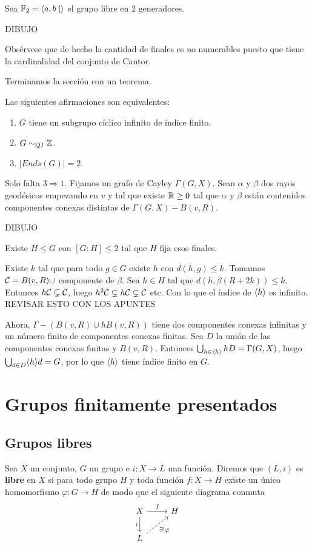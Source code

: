 \documentclass[twoside, 11pt]{article}
\begin{document}
\begin{ej}
Sea $\mathbb{F}_2=\langle{a,b\mid}\rangle$ el grupo libre en 2 generadores.

DIBUJO

Obsérvese que de hecho la cantidad de finales es no numerables puesto que tiene la cardinalidad del conjunto de Cantor. 
\end{ej}

Terminamos la sección con un teorema.

\begin{teorema}
Las siguientes afirmaciones son equivalentes:
\begin{enumerate}
\item $G$ tiene un subgrupo cíclico infinito de índice finito.
\item $G\sim_{QI}\mathbb{Z}$.
\item $|Ends(G)|=2$.
\end{enumerate}
\end{teorema}
\begin{dem}
Solo falta $3\Rightarrow 1$. Fijamos un grafo de Cayley $\Gamma(G,X)$. Sean $\alpha$ y $\beta$ dos rayos geodésicos empezando en $v$ y tal que existe $\mathbb{R}\geq 0$ tal que $\alpha$ y $\beta$ están contenidos componentes conexas distintas  de $\Gamma(G,X)-B(v,R)$.

DIBUJO

Existe $H\leq G$ con $[G:H]\leq 2$ tal que $H$ fija esos finales.

Existe $k$ tal que para todo $g\in G$ existe $h$ con $d(h,g)\leq k$. Tomamos $\mathcal{C}=B(v,R)\cup$ componente de $\beta$. Sea $h\in H$ tal que $d(h,\beta(R+2k))\leq k$. Entonces $h\mathcal{C}\subsetneq \mathcal{C}$, luego $h^2\mathcal{C}\subsetneq h\mathcal{C}\subsetneq\mathcal{C}$ etc. Con lo que el índice de $\langle{h}\rangle$ es infinito. REVISAR ESTO CON LOS APUNTES

Ahora, $\Gamma-(B(v,R)\cup hB(v,R))$ tiene dos componentes conexas infinitas y un número finito de componentes conexas finitas. Sea $D$ la unión de las componentes conexas finitas y $B(v,R)$. Entonces $\bigcup_{h\in\langle{h}\rangle} hD=\Gamma(G,X)$, luego $\bigcup_{d\in D}\langle{h}\rangle d=G$, por lo que $\langle{h}\rangle$ tiene índice finito en $G$.
\QED
\end{dem}

\section{Grupos finitamente presentados}
\subsection{Grupos libres}
\begin{defi}
Sea $X$ un conjunto, $G$ un grupo e $i:X\to L$ una función. Diremos que $(L,i)$ es \textbf{libre} en $X$ si para todo grupo $H$ y toda función $f:X\to H$ existe un único homomorfismo $\varphi:G\to H$ de modo que el siguiente diagrama conmuta
\[
\begin{tikzcd}
X\arrow[r, "f"]\arrow[d,"i"'] & H\\
L\arrow[ur, dashed, "\exists!\varphi"']
\end{tikzcd}
\]
\end{defi}
\end{document}

